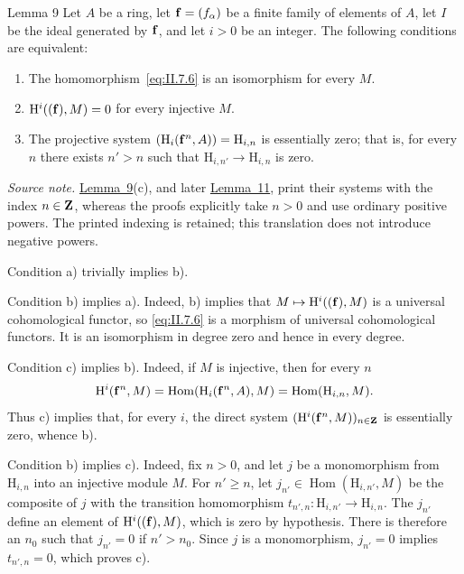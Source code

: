 \begin{sgastatement}{Lemma 9}
Let $A$ be a ring, let $\mathbf f=(f_\alpha)$ be a finite family of
elements of $A$, let $I$ be the ideal generated by $\mathbf f$, and let $i>0$ be
an integer. The following conditions are equivalent:
\begin{enumerate}[label=\textup{\alph*)},leftmargin=2.5em]
  \item The homomorphism~\eqref{eq:II.7.6} is an isomorphism for every $M$.
  \item $\mathrm H^i((\mathbf f),M)=0$ for every injective $M$.
  \item The projective system
  $(\mathrm H_i(\mathbf f^n,A))=\mathrm H_{i,n}$ is essentially zero; that is,
  for every $n$ there exists $n'>n$ such that
  $\mathrm H_{i,n'}\to\mathrm H_{i,n}$ is zero.
\end{enumerate}
\end{sgastatement}

\noindent\textit{Source note.} \hyperref[II.9]{Lemma~9}(c), and later \hyperref[II.11]{Lemma~11}, print their
systems with the index $n\in\mathbf Z$, whereas the proofs explicitly take $n>0$
and use ordinary positive powers. The printed indexing is retained; this
translation does not introduce negative powers.

Condition a) trivially implies b).

Condition b) implies a). Indeed, b) implies that
$M\mapsto\mathrm H^i((\mathbf f),M)$ is a universal cohomological functor, so
\eqref{eq:II.7.6} is a morphism of universal cohomological functors. It is an
isomorphism in degree zero and hence in every degree.

Condition c) implies b). Indeed, if $M$ is injective, then for every $n$
\[
  \mathrm H^i(\mathbf f^n,M)
  =\operatorname{Hom}(\mathrm H_i(\mathbf f^n,A),M)
  =\operatorname{Hom}(\mathrm H_{i,n},M).
\]
Thus c) implies that, for every $i$, the direct system
$(\mathrm H^i(\mathbf f^n,M))_{n\in\mathbf Z}$ is essentially zero, whence b).

Condition b) implies c). Indeed, fix $n>0$, and let $j$ be a monomorphism
from $\mathrm H_{i,n}$ into an injective module $M$. For $n'\geq n$, let
$j_{n'}\in\operatorname{Hom}(\mathrm H_{i,n'},M)$ be the composite of $j$
with the transition homomorphism
$t_{n',n}\colon\mathrm H_{i,n'}\to\mathrm H_{i,n}$. The $j_{n'}$ define an
element of $\mathrm H^i((\mathbf f),M)$, which is zero by hypothesis. There is
therefore an $n_0$ such that $j_{n'}=0$ if $n'>n_0$. Since $j$ is a
monomorphism, $j_{n'}=0$ implies $t_{n',n}=0$, which proves c).

